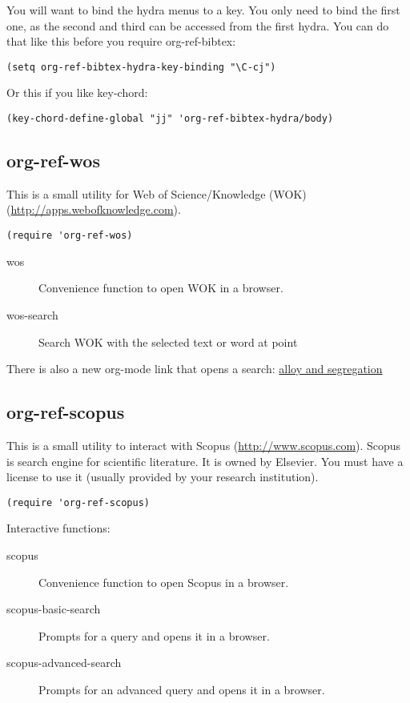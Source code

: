 \documentclass[11pt]{article}
\begin{document}
{You will want to bind the hydra menus to a key. You only need to bind the first one, as the second and third can be accessed from the first hydra.
You can do that like this before you require org-ref-bibtex:

\begin{verbatim}
(setq org-ref-bibtex-hydra-key-binding "\C-cj")
\end{verbatim}

Or this if you like key-chord:

\begin{verbatim}
(key-chord-define-global "jj" 'org-ref-bibtex-hydra/body)
\end{verbatim}

\subsection{org-ref-wos}
\label{sec:orgheadline20}
This is a small utility for Web of Science/Knowledge (WOK) (\url{http://apps.webofknowledge.com}).

\begin{verbatim}
(require 'org-ref-wos)
\end{verbatim}

\begin{description}
\item[{wos}] Convenience function to open WOK in a browser.
\item[{wos-search}] Search WOK with the selected text or word at point
\end{description}

There is also a new org-mode link that opens a search: \url{alloy and segregation}

\subsection{org-ref-scopus}
\label{sec:orgheadline21}
This is a small utility to interact with Scopus (\url{http://www.scopus.com}). Scopus is search engine for scientific literature. It is owned by Elsevier. You must have a license to use it (usually provided by your research institution).

\begin{verbatim}
(require 'org-ref-scopus)
\end{verbatim}

Interactive functions:

\begin{description}
\item[{scopus}] Convenience function to open Scopus in a browser.
\item[{scopus-basic-search}] Prompts for a query and opens it in a browser.
\item[{scopus-advanced-search}] Prompts for an advanced query and opens it in a browser.
\end{description}

}
\end{document}
